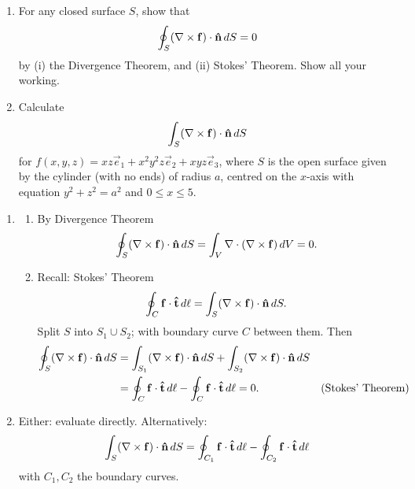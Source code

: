 \documentclass[10pt, a4paper]{article}
\begin{document}
\begin{problem}[$2014$ Question $9$]\phantom{}
    \begin{enumerate}[label = (\alph*)]
        \item For any closed surface $S$,
        show that
        \[
        \oint_{S}(\mathbf{\nabla} \times \mathbf{f})\cdot\mathbf{\hat{n}}\,dS = 0
        \]
        by (i) the Divergence Theorem,
        and (ii) Stokes' Theorem.
        Show all your working.

        \item Calculate
        \[
        \int_{S}(\mathbf{\nabla} \times \mathbf{f})\cdot\mathbf{\hat{n}}\,dS
        \]
        for $f(x, y, z) = xz\vec{e}_1 + x ^ 2y ^ 2z\vec{e}_2 + xyz\vec{e}_3$,
        where $S$ is the open surface given by the cylinder
        (with no ends)
        of radius $a$,
        centred on the $x$-axis with equation $y ^ 2 + z ^ 2 = a ^ 2$ and $0 \leq x \leq 5$.
    \end{enumerate}

    \begin{solution}\phantom{}
        \begin{enumerate}[label = (\alph*)]
            \item \phantom{}
            \begin{enumerate}[label = (\roman*)]
                \item By Divergence Theorem
                \[
                \oint_{S}(\mathbf{\nabla} \times \mathbf{f})\cdot\mathbf{\hat{n}}\,dS = \int_{V}\mathbf{\nabla}\cdot(\mathbf{\nabla} \times \mathbf{f})\,dV = 0.
                \]
    
                \item
                Recall:
                Stokes' Theorem
                \[
                \oint_{C}\mathbf{f}\cdot\mathbf{\hat{t}}\,d\ell = \int_{S}(\mathbf{\nabla} \times \mathbf{f})\cdot\mathbf{\hat{n}}\,dS.
                \]
                Split $S$ into $S_1 \cup S_2$;
                with boundary curve $C$ between them.
                Then
                \begin{align*}
                    \oint_{S}(\mathbf{\nabla} \times \mathbf{f})\cdot\mathbf{\hat{n}}\,dS &= \int_{S_1}(\mathbf{\nabla} \times \mathbf{f})\cdot\mathbf{\hat{n}}\,dS + \int_{S_2}(\mathbf{\nabla} \times \mathbf{f})\cdot\mathbf{\hat{n}}\,dS \\
                    &= \oint_{C}\mathbf{f}\cdot\mathbf{\hat{t}}\,d\ell - \oint_{C}\mathbf{f}\cdot\mathbf{\hat{t}}\,d\ell = 0. &&(\text{Stokes' Theorem})
                \end{align*}
            \end{enumerate}

            \item
            Either:
            evaluate directly.
            Alternatively:
            \[
            \int_{S}(\mathbf{\nabla} \times \mathbf{f})\cdot\mathbf{\hat{n}}\,dS = \oint_{C_1}\mathbf{f}\cdot\mathbf{\hat{t}}\,d\ell - \oint_{C_2}\mathbf{f}\cdot\mathbf{\hat{t}}\,d\ell
            \]
            with $C_1, C_2$ the boundary curves.
            
        \end{enumerate}
    \end{solution}
\end{problem}
\end{document}
